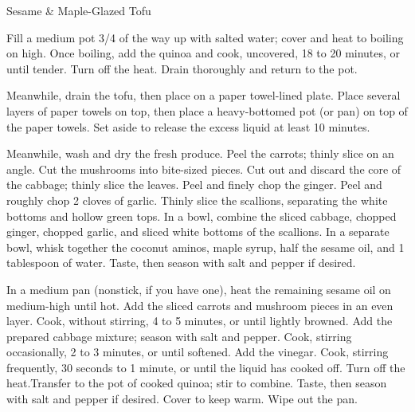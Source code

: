 \begin{recipe}[\vegan]{Sesame \& Maple-Glazed Tofu}

    \begin{ingredients}
    \end{ingredients}

    \begin{instructions}
        Fill a medium pot 3/4 of the way up with salted water; cover and heat to boiling on high. Once boiling, add the quinoa and cook, uncovered, 18 to 20 minutes, or until tender. Turn off the heat. Drain thoroughly and return to the pot. 

        Meanwhile, drain the tofu, then place on a paper towel-lined plate. Place several layers of paper towels on top, then place a heavy-bottomed pot (or pan) on top of the paper towels. Set aside to release the excess liquid at least 10 minutes. 

        Meanwhile, wash and dry the fresh produce. Peel the carrots; thinly slice on an angle. Cut the mushrooms into bite-sized pieces. Cut out and discard the core of the cabbage; thinly slice the leaves. Peel and finely chop the ginger. Peel and roughly chop 2 cloves of garlic. Thinly slice the scallions, separating the white bottoms and hollow green tops. In a bowl, combine the sliced cabbage, chopped ginger, chopped garlic, and sliced white bottoms of the scallions. In a separate bowl, whisk together the coconut aminos, maple syrup, half the sesame oil, and 1 tablespoon of water. Taste, then season with salt and pepper if desired.

        In a medium pan (nonstick, if you have one), heat the remaining sesame oil on medium-high until hot. Add the sliced carrots and mushroom pieces in an even layer. Cook, without stirring, 4 to  5 minutes, or until lightly browned. Add the prepared cabbage mixture; season with salt and pepper. Cook, stirring occasionally, 2 to 3 minutes, or until softened. Add the vinegar. Cook, stirring frequently, 30 seconds to 1 minute, or until the liquid has cooked off. Turn off the heat.Transfer to the pot of cooked quinoa; stir to combine. Taste, then season with salt and pepper if desired. Cover to keep warm. Wipe out the pan. 


\end{instructions}
\end{recipe}

